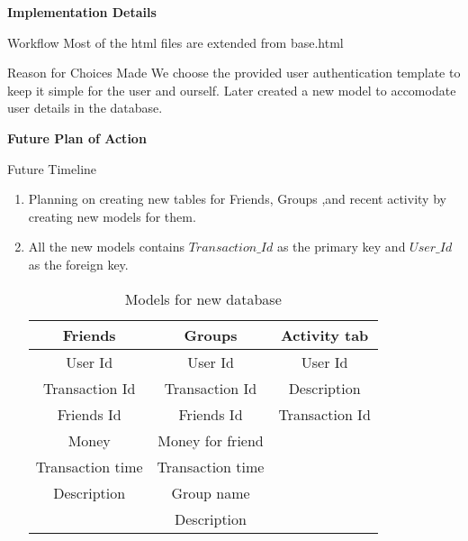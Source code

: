 \documentclass{beamer}
\begin{document}
\begin{frame}[fragile]{\bf  Implementation Details}
\begin{block}{Workflow}
Most of the html files are extended from base.html
\end{block}

\begin{block}{Reason for Choices Made}
We choose the provided user authentication template to keep it simple for the user and ourself. Later created a new model to accomodate user details in the database.  
\end{block}
\end{frame}
\begin{frame}[fragile]{\bf  Future Plan of Action}
\begin{block}{Future Timeline}
\begin{enumerate}
\item Planning on creating new tables for Friends, Groups ,and recent activity by creating new models for them.
\item All the new models contains $Transaction\_Id$ as the primary key and $User\_Id$ as the foreign key.
\begin{table}
\begin{tabular}{ c | c | c}
Friends & Groups & Activity tab \\
\hline \hline
User Id & User Id & User Id\\ 
Transaction Id & Transaction Id & Description\\
Friends Id & Friends Id & Transaction Id\\
Money & Money for friend & \\
Transaction time & Transaction time&\\
Description& Group name &\\
& Description &
\end{tabular}
\caption{Models for new database}
\end{table}
\end{enumerate}
\end{block}
\end{frame}
\end{document}
